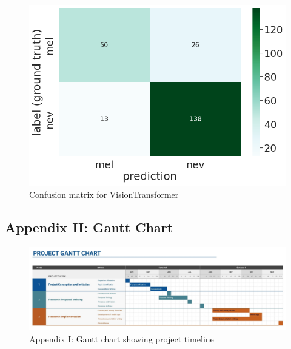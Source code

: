 \documentclass[12pt, a4paper]{article}
\begin{document}
\begin{figure}[h]
    \centering
    \setlength{\fboxsep}{8pt}
    \includegraphics[scale=0.5, fbox]{images/matrix-vit.png}
    \caption{Confusion matrix for VisionTransformer}
    \label{fig:matrix-vit}
\end{figure}
\clearpage
\begin{landscape}
    \thispagestyle{empty}
    \subsection*{Appendix II: Gantt Chart}
    \begin{figure}[h]
        \centering
        \includegraphics[scale=0.34]{gantt.jpg}
        \caption*{Appendix I: Gantt chart showing project timeline}
    \end{figure}
    \vfill
    \raisebox{0pt}{\makebox[\linewidth]{\thepage}}
\end{landscape}
\end{document}
